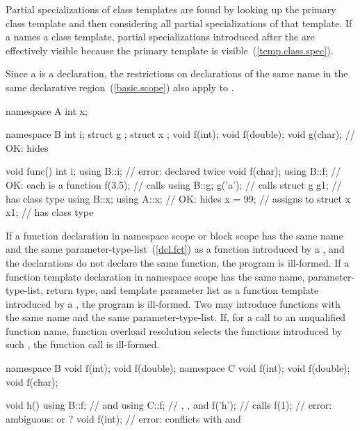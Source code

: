 \pnum
\enternote
Partial specializations of class templates are found by looking up the
primary class template and then considering all partial specializations
of that template. If a  names a class
template, partial specializations introduced after the
 are effectively visible because the primary
template is visible~(\ref{temp.class.spec}).
\exitnote

\pnum
Since a  is a declaration, the restrictions
on declarations of the same name in the same declarative
region~(\ref{basic.scope}) also apply to .
\enterexample

\begin{codeblock}
namespace A {
  int x;
}

namespace B {
  int i;
  struct g { };
  struct x { };
  void f(int);
  void f(double);
  void g(char);     // OK: hides 
}

void func() {
  int i;
  using B::i;       // error:  declared twice
  void f(char);
  using B::f;       // OK: each  is a function
  f(3.5);           // calls 
  using B::g;
  g('a');           // calls 
  struct g g1;      //  has class type 
  using B::x;
  using A::x;       // OK: hides 
  x = 99;           // assigns to 
  struct x x1;      //  has class type 
}
\end{codeblock}
\exitexample

\pnum
If a function declaration in namespace scope or block scope has the same
name and the same parameter-type-list~(\ref{dcl.fct}) as
a function introduced by a , and the
declarations do not declare the same function, the program is
ill-formed. If a function template declaration in namespace scope has
the same name, parameter-type-list, return type, and template
parameter list as a function template introduced by a
, the program is ill-formed.
\enternote
Two  may introduce functions with the same
name and the same parameter-type-list. If, for a call to an unqualified
function name, function overload resolution selects the functions
introduced by such , the function call is
ill-formed.
\enterexample

\begin{codeblock}
namespace B {
  void f(int);
  void f(double);
}
namespace C {
  void f(int);
  void f(double);
  void f(char);
}

void h() {
  using B::f;       //  and 
  using C::f;       // , , and 
  f('h');           // calls 
  f(1);             // error: ambiguous:  or ?
  void f(int);      // error:  conflicts with  and 
}
\end{codeblock}
\exitexample
\exitnote

